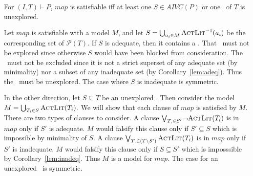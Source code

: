 \begin{lemma}
\label{lem:map:comp}
For $(I, T) \vdash P$, $map$ is satisfiable iff
at least one $S \in AIVC(P)$ or one \mis\ of $T$ is unexplored.
\end{lemma}
\begin{IEEEproof}
Let $map$ is satisfiable with a model $M$, and let $S = \bigcup_{a_i
  \in M} \textsc{ActLit} ^{-1} (a_i)$ be the corresponding set of
$\mathcal{P}(T)$. If $S$ is adequate, then it contains a \mivc. That
\mivc\ must not be explored since otherwise $S$ would have been blocked
from consideration. The \mivc\ must not be excluded since it is not a
strict superset of any adequate set (by minimality) nor a subset of
any inadequate set (by Corollary~\ref{lem:adeq}). Thus the \mivc\ must
be unexplored. The case where $S$ is inadequate is symmetric.

In the other direction, let $S \subseteq T$ be an unexplored \mivc.
Then consider the model $M = \bigcup_{T_i\in S} \textsc{ActLit}(T_i)$. We will
show that each clause of $map$ is satisfied by $M$. There are two
types of clauses to consider. A clause $\bigvee_{T_{i}\in S'} \neg
{\textsc{ActLit}(T_i)}$ is in $map$ only if $S'$ is adequate. $M$ would
falsify this clause only if $S' \subseteq S$ which is impossible by
minimality of $S$. A clause $\bigvee_{T_{i}\in (T \setminus S')}
\textsc{ActLit} (T_i)$ is in $map$ only if $S'$ is inadequate. $M$ would
falsify this clause only if $S \subseteq S'$ which is imposssible by
Corollary~\ref{lem:inadeq}. Thus $M$ is a model for $map$. The case
for an unexplored \mis\ is symmetric.
\end{IEEEproof}


